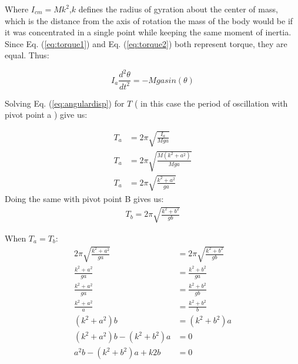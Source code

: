 \documentclass[12pt]{article}
\begin{document}
Where $I_{cm} = Mk^2$,$k$ defines the radius of gyration about the center of mass, which is the distance from the axis of rotation the mass of the body would be if it was concentrated in a single point while keeping the same moment of inertia. Since Eq. (\ref{eq:torque1}) and Eq. (\ref{eq:torque2}) both represent torque, they are equal. Thus:

\begin{equation}
        I_a\frac{d^2\theta}{dt^2}=-Mgasin\left(\theta\right) \label{eq:angulardisp}
\end{equation}

Solving Eq. (\ref{eq:angulardisp}) for $T$ ( in this case the period of oscillation with pivot point a ) give us:

\begin{align}
    T_a&=2\pi \sqrt{\frac{I_a}{Mga}}\nonumber\\
    T_a&=2\pi \sqrt{\frac{M(k^2+a^2)}{ Mga }}\nonumber\\
    T_a&=2\pi \sqrt{\frac{k^2+a^2}{ga}} \label{eq:perioda}
\end{align}
Doing the same with pivot point B gives us:
\begin{gather}
    T_b=2\pi \sqrt{\frac{k^2+b^2}{gb}}\label{eq:periodb}
\end{gather}

When $T_a = T_b$:  
\begin{align*}
    2\pi \sqrt{\frac{k^2+a^2}{ga}}&=2\pi \sqrt{\frac{k^2+b^2}{gb}}\\
    \frac{k^2+a^2}{ ga }&= \frac{ k^2+b^2 }{ ga }\\
    \frac{ k^2+a^2 }{ ga }&= \frac{ k^2+b^2 }{ gb }\\
    \frac{ k^2+a^2 }{ a }&= \frac{ k^2+b^2 }{ b }\\
    (k^2+a^2)b &=(k^2+b^2)a \\
    (k^2+a^2)b-(k^2+b^2)a &= 0\\
    a^2b-(k^2+b^2)a + k2b &=0
\end{align*}
\end{document}
